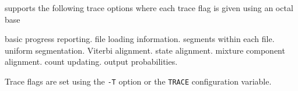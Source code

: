 
 supports the following trace options where each
trace flag is given using an octal base
\begin{optlist}
    basic progress reporting.
    file loading information.
    segments within each file.
    uniform segmentation.
    Viterbi alignment.
    state alignment.
    mixture component alignment.
    count updating.
    output probabilities.
\end{optlist}
Trace flags are set using the \texttt{-T} option or the  \texttt{TRACE} 
configuration variable.


